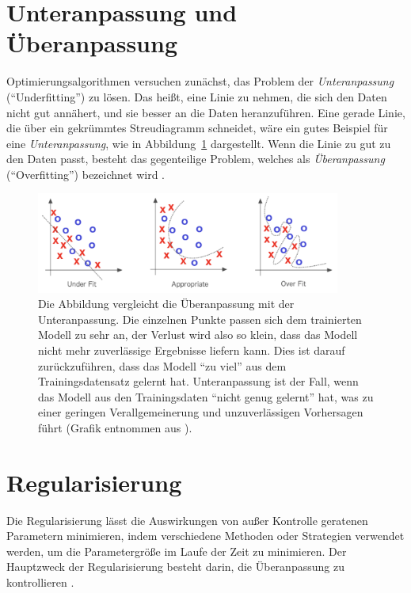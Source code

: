 \section{Unteranpassung und Überanpassung}\label{overundersec}
Optimierungsalgorithmen versuchen zunächst, das Problem der \textit{Unteranpassung} (\enquote{Underfitting}) zu lösen. Das heißt, eine Linie zu nehmen, die sich den Daten nicht gut annähert, und sie besser an die Daten heranzuführen. Eine gerade Linie, die über ein gekrümmtes Streudiagramm schneidet, wäre ein gutes Beispiel für eine \textit{Unteranpassung}, wie in Abbildung~\ref{Kap2:OverUnder} dargestellt. Wenn die Linie zu gut zu den Daten passt, besteht das  gegenteilige Problem, welches als \textit{Überanpassung} (\enquote{Overfitting}) bezeichnet wird \cite*[27]{Patterson2019}.

\begin{figure}[H]
    \centering
    \includegraphics[width=10cm]{kapitel2/overundefit.png}
    \caption[Vergleich der Unteranpassung mit der Überanpassung]{Die Abbildung vergleicht die Überanpassung mit der Unteranpassung. Die einzelnen Punkte passen sich dem trainierten Modell zu sehr an, der Verlust wird also so klein, dass das Modell nicht mehr zuverlässige Ergebnisse liefern kann. Dies ist darauf zurückzuführen, dass das Modell \enquote{zu viel} aus dem Trainingsdatensatz gelernt hat. Unteranpassung ist der Fall, wenn das Modell aus den Trainingsdaten \enquote{nicht genug gelernt} hat, was zu einer geringen Verallgemeinerung und unzuverlässigen Vorhersagen führt (Grafik entnommen aus \cite*[27]{Patterson2019}). }
    \label{Kap2:OverUnder}
\end{figure}

\section{Regularisierung}\label{regSec}
Die Regularisierung lässt die Auswirkungen von außer Kontrolle geratenen Parametern minimieren, indem verschiedene Methoden oder Strategien verwendet werden, um die Parametergröße im Laufe der Zeit zu minimieren. Der Hauptzweck der Regularisierung besteht darin, die Überanpassung zu kontrollieren \cite*[79]{Patterson2019}.

